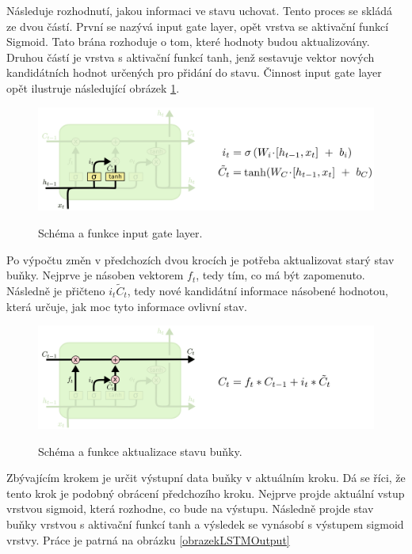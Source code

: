 Následuje rozhodnutí, jakou informaci ve stavu uchovat.
Tento proces se skládá ze dvou částí.
První se nazývá input gate layer, 
opět vrstva se aktivační funkcí Sigmoid.
Tato brána rozhoduje o tom, které hodnoty budou aktualizovány.
Druhou částí je vrstva s aktivační funkcí tanh,
jenž sestavuje vektor nových kandidátních hodnot
určených pro přidání do stavu.
Činnost input gate layer opět ilustruje následující obrázek \ref{obrazekInputLayer}.

\begin{figure}[h]\centering
    \centering
    \includegraphics[width=0.8\linewidth]{obrazky/LSTM3-focus-i.png}\\[1pt]  
    \caption{Schéma a funkce input gate layer. \cite{colah_lstm}}    
    \label{obrazekInputLayer}
\end{figure}

Po výpočtu změn v předchozích dvou krocích
je potřeba aktualizovat starý stav buňky.
Nejprve je násoben vektorem $f_t$, tedy tím, co má být zapomenuto.
Následně je přičteno $i_t\tilde{C}_t $, 
tedy nové kandidátní informace násobené hodnotou,
která určuje, jak moc tyto informace ovlivní stav.

\begin{figure}[h]\centering
    \centering
    \includegraphics[width=0.8\linewidth]{obrazky/LSTM3-focus-C.png}\\[1pt]  
    \caption{Schéma a funkce aktualizace stavu buňky. \cite{colah_lstm}}    
    \label{obrazekAktualizaceLSTM}
\end{figure}

Zbývajícím krokem je určit výstupní data buňky v aktuálním kroku.
Dá se říci, že tento krok je podobný obrácení předchozího kroku.
Nejprve projde aktuální vstup vrstvou sigmoid, 
která rozhodne, co bude na výstupu.
Následně projde stav buňky vrstvou s aktivační funkcí tanh
a výsledek se vynásobí s výstupem sigmoid vrstvy.
Práce je patrná na obrázku \ref{obrazekLSTMOutput}

